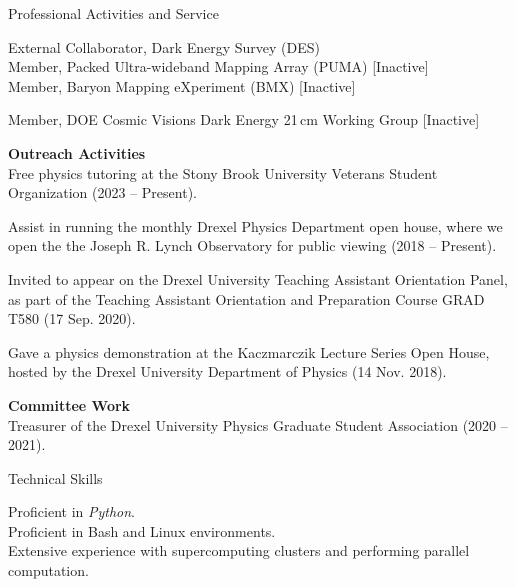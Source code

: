 \documentclass{resume} %
\begin{document}


\begin{rSection}{Professional Activities and Service}

\begin{description}[leftmargin=10em, style=nextline]

\item[Collaborations] External Collaborator, Dark Energy Survey (DES)\\
  Member, Packed Ultra-wideband Mapping Array (PUMA) [Inactive]\\
  Member, Baryon Mapping eXperiment (BMX) [Inactive]

\item[Working Groups] Member, DOE Cosmic Visions Dark Energy 21$\,$cm Working Group [Inactive]


\end{description}

\textbf{Outreach Activities}\\
Free physics tutoring at the Stony Brook University Veterans Student Organization (2023 -- Present).

Assist in running the monthly Drexel Physics Department open house, where we open the the Joseph R. Lynch Observatory for public viewing (2018 -- Present).

Invited to appear on the Drexel University Teaching Assistant Orientation Panel, as part of the Teaching Assistant Orientation and Preparation Course GRAD T580 (17 Sep. 2020).

Gave a physics demonstration at the Kaczmarczik Lecture Series Open House, hosted by the Drexel University Department of Physics (14 Nov. 2018).

\textbf{Committee Work}\\
Treasurer of the Drexel University Physics Graduate Student Association (2020 -- 2021).

\end{rSection}



\begin{rSection}{Technical Skills}

Proficient in \textit{Python}.\\
Proficient in Bash and Linux environments.\\
Extensive experience with supercomputing clusters and performing parallel computation.

\end{rSection}
\end{document}
